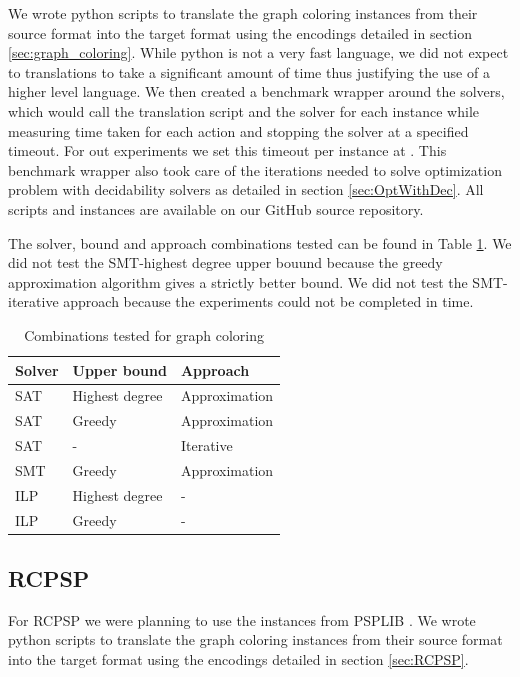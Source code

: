 \documentclass{sig-alternate}
\begin{document}
We wrote python scripts to translate the graph coloring instances from their source format into the target format using the encodings detailed in section \ref{sec:graph_coloring}.
While python is not a very fast language, we did not expect to translations to take a significant amount of time thus justifying the use of a higher level language.
We then created a benchmark wrapper around the solvers, which would call the translation script and the solver for each instance while measuring time taken for each action and stopping the solver at a specified timeout.
For out experiments we set this timeout per instance at .
This benchmark wrapper also took care of the iterations needed to solve optimization problem with decidability solvers as detailed in section \ref{sec:OptWithDec}. All scripts and instances are available on our GitHub source repository.

The solver, bound and approach combinations tested can be found in Table \ref{table:gccombinations}.
We did not test the SMT-highest degree upper bouund because the greedy approximation algorithm gives a strictly better bound.
We did not test the SMT-iterative approach because the experiments could not be completed in time.

\begin{table}
\begin{tabular}{ |l|l|l| }
\hline
Solver & Upper bound & Approach \\
\hline
SAT & Highest degree & Approximation \\
\hline
SAT & Greedy & Approximation \\
\hline
SAT & - & Iterative \\
\hline
SMT & Greedy & Approximation \\
\hline
ILP & Highest degree & - \\
\hline
ILP & Greedy & - \\
\hline
\end{tabular}
\caption{Combinations tested for graph coloring}
\label{table:gccombinations}
\end{table}

\subsection{RCPSP}

For RCPSP we were planning to use the instances from PSPLIB \cite{kolisch1997psplib}.
We wrote python scripts to translate the graph coloring instances from their source format into the target format using the encodings detailed in section \ref{sec:RCPSP}.
\end{document}

